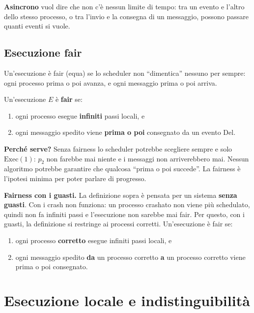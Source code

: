 \textbf{Asincrono} vuol dire che non c'è nessun limite di tempo: tra un evento e l'altro dello stesso processo, o tra l'invio e la consegna di un messaggio, possono passare quanti eventi si vuole.

\subsection{Esecuzione fair}

\begin{inbreve}

Un'esecuzione è fair (equa) se lo scheduler non ``dimentica'' nessuno per sempre: ogni processo prima o poi avanza, e ogni messaggio prima o poi arriva.

\end{inbreve}

Un'esecuzione \(E\) è \textbf{fair} se:

\begin{enumerate}
\def\labelenumi{\arabic{enumi}.}
\tightlist
\item
  ogni processo esegue \textbf{infiniti} passi locali, e
\item
  ogni messaggio spedito viene \textbf{prima o poi} consegnato da un evento \(\text{Del}\).
\end{enumerate}

\textbf{Perché serve?} Senza fairness lo scheduler potrebbe scegliere sempre e solo \(\text{Exec}(1)\): \(p_2\) non farebbe mai niente e i messaggi non arriverebbero mai. Nessun algoritmo potrebbe garantire che qualcosa ``prima o poi succede''. La fairness è l'ipotesi minima per poter parlare di progresso.

\textbf{Fairness con i guasti.} La definizione sopra è pensata per un sistema \textbf{senza guasti}. Con i crash non funziona: un processo crashato non viene più schedulato, quindi non fa infiniti passi e l'esecuzione non sarebbe mai fair. Per questo, con i guasti, la definizione si restringe ai processi corretti. Un'esecuzione è fair se:

\begin{enumerate}
\def\labelenumi{\arabic{enumi}.}
\tightlist
\item
  ogni processo \textbf{corretto} esegue infiniti passi locali, e
\item
  ogni messaggio spedito \textbf{da} un processo corretto \textbf{a} un processo corretto viene prima o poi consegnato.
\end{enumerate}

\section{Esecuzione locale e indistinguibilità}


